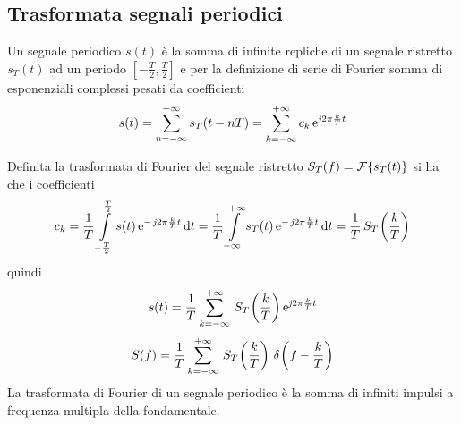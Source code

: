 \subsection{Trasformata segnali periodici}
Un segnale periodico $s(t)$ è la somma di infinite repliche di un segnale ristretto $s_T(t)$ ad un periodo $\left[-\frac{T}{2},\frac{T}{2}\right]$ e per la definizione di serie di Fourier somma di esponenziali complessi pesati da coefficienti
\begin{equation}
	s(t)=\sum_{n=-\infty}^{+\infty}{s_T(t-n T)}=\sum_{k=-\infty}^{+\infty}{c_k\operatorname{e}^{\operatorname{\mathit{j}\!} 2\pi\frac{k}{T}t}}
\end{equation}

Definita la trasformata di Fourier del segnale ristretto $S_T(f)=\operatorname{\mathcal{F}}\!\left\lbrace{s_T(t)}\right\rbrace$ si ha che i coefficienti
\[
	c_k=\frac{1}{T}\int\limits_{-\frac{T}{2}}^{\frac{T}{2}}{s(t)\operatorname{e}^{-\operatorname{\mathit{j}\!} 2\pi\frac{k}{T}t}}{\,\mathop{}\!\mathrm{d}{t}}=\frac{1}{T}\int\limits_{-\infty}^{+\infty}{s_T(t)\operatorname{e}^{-\operatorname{\mathit{j}\!} 2\pi\frac{k}{T}t}}{\,\mathop{}\!\mathrm{d}{t}}=\frac{1}{T}\,{S_T}^{}\!\left({\frac{k}{T}}\right)
\]
quindi
\[
	s(t)=\frac{1}{T}\sum_{k=-\infty}^{+\infty}{\,{S_T}^{}\!\left({\frac{k}{T}}\right)\operatorname{e}^{\operatorname{\mathit{j}\!} 2\pi\frac{k}{T}t}}
\]
\begin{equation}
	S(f)=\frac{1}{T}\sum_{k=-\infty}^{+\infty}{\,{S_T}^{}\!\left({\frac{k}{T}}\right)\,{\delta}^{}\!\left({f-\frac{k}{T}}\right)}
\end{equation}
La trasformata di Fourier di un segnale periodico è la somma di infiniti impulsi a frequenza multipla della fondamentale.

\clearpage
